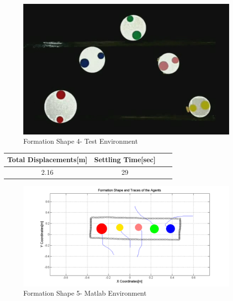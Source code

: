 \documentclass[twoside]{article}
\begin{document}
					\begin{figure}[H]
						\caption{Formation Shape 4- Test Environment}
						\centerline{\includegraphics[scale = 0.35]{6_real_hardware}}
					\end{figure} 
					
					\begin{center}
						 \label{tab:title} 
						\begin{tabular}{||c| c |c |c ||}
							
							\hline
							\textbf{Total Displacements[m]}  & \textbf{Settling Time[sec]}\\ 
							\hline
							2.16 & 29 \\
							\hline
						\end{tabular}
					\end{center}
		
		
		
					\begin{figure}[H]
						\caption{Formation Shape 5- Matlab Environment}
						\centerline{\includegraphics[scale = 0.45]{9_hardware}}
					\end{figure} 
					
\end{document}
